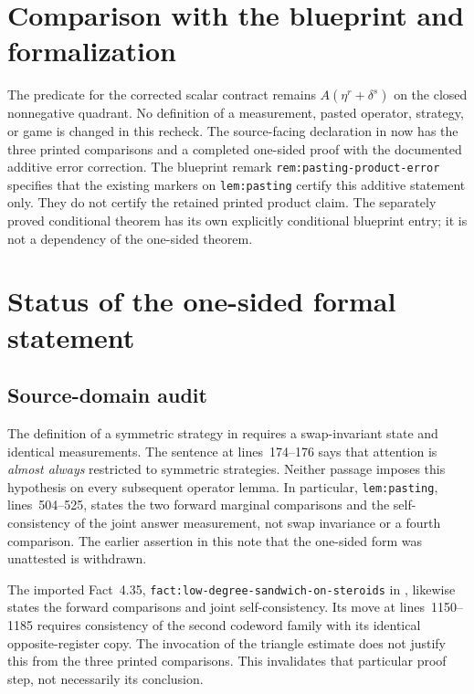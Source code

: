 \documentclass[11pt]{article}
\begin{document}
\section{Comparison with the blueprint and formalization}

The predicate for the corrected scalar contract remains
$A(\eta^r+\delta^s)$ on the closed nonnegative quadrant. No definition of a
measurement, pasted operator, strategy, or game is changed in this recheck.
The source-facing declaration
 in
 now has the three printed
comparisons and a completed one-sided proof with the documented additive
error correction. The blueprint remark
\texttt{rem:pasting-product-error} specifies that the existing markers on
\texttt{lem:pasting} certify this additive statement only. They do not
certify the retained printed product claim. The separately proved conditional theorem
 has its own explicitly
conditional blueprint entry; it is not a dependency of the one-sided theorem.

\section{Status of the one-sided formal statement}

\subsection*{Source-domain audit}

The definition of a symmetric strategy in
\cite[lines~84--86]{Ji2020MIPStar} requires a swap-invariant state and identical
measurements. The sentence at lines~174--176 says that attention is
\emph{almost always} restricted to symmetric strategies. Neither passage
imposes this hypothesis on every subsequent operator lemma. In particular,
\texttt{lem:pasting}, lines~504--525, states the two forward marginal
comparisons and the self-consistency of the joint answer measurement, not
swap invariance or a fourth comparison. The earlier assertion in this note
that the one-sided form was unattested is withdrawn.

The imported Fact~4.35, \texttt{fact:low-degree-sandwich-on-steroids} in
\cite[lines~1000--1030]{Natarajan2018NEEXP}, likewise states the forward
comparisons and joint self-consistency. Its move at lines~1150--1185 requires
consistency of the second codeword family with its identical opposite-register
copy. The invocation of the triangle estimate does not justify this from the
three printed comparisons. This invalidates that particular proof step, not
necessarily its conclusion.
\end{document}
